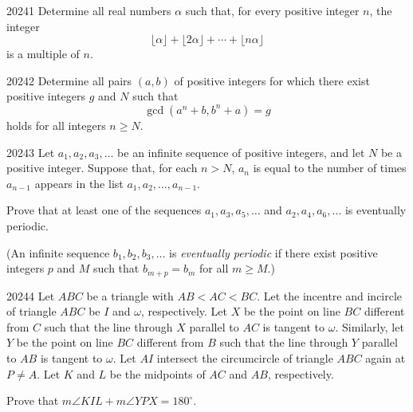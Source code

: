 
\begin{problem}{2024}{1}
Determine all real numbers $\alpha$ such that, for every positive integer $n$, the integer
\[
    \lfloor\alpha\rfloor+\lfloor2\alpha\rfloor+\cdots+\lfloor n\alpha\rfloor
\]
is a multiple of $n$.
\end{problem}

\begin{problem}{2024}{2}
Determine all pairs $(a, b)$ of positive integers for which there exist positive integers $g$ and $N$ such that
\[
    \gcd(a^n+b, b^n+a)=g
\]
holds for all integers $n\geq N$.
\end{problem}

\begin{problem}{2024}{3}
Let $a_1, a_2, a_3, \dots$ be an infinite sequence of positive integers, and let $N$ be a positive integer. Suppose that, for each $n>N$, $a_n$ is equal to the number of times $a_{n-1}$ appears in the list $a_1, a_2, \dots, a_{n-1}$.

Prove that at least one of the sequences $a_1, a_3, a_5, \dots$ and $a_2, a_4, a_6, \dots$ is eventually periodic.

(An infinite sequence $b_1, b_2, b_3, \dots$ is \emph{eventually periodic} if there exist positive integers $p$ and $M$ such that $b_{m+p}=b_m$ for all $m\geq M$.)
\end{problem}

\begin{problem}{2024}{4}
Let $ABC$ be a triangle with $AB<AC<BC$. Let the incentre and incircle of triangle $ABC$ be $I$ and $\omega$, respectively. Let $X$ be the point on line $BC$ different from $C$ such that the line through $X$ parallel to $AC$ is tangent to $\omega$. Similarly, let $Y$ be the point on line $BC$ different from $B$ such that the line through $Y$ parallel to $AB$ is tangent to $\omega$. Let $AI$ intersect the circumcircle of triangle $ABC$ again at $P\ne A$. Let $K$ and $L$ be the midpoints of $AC$ and $AB$, respectively.

Prove that $m\angle KIL+m\angle YPX=180^\circ$.
\end{problem}

